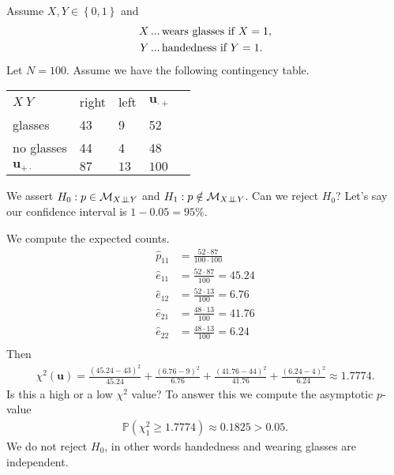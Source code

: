 \begin{eg}
  Assume \( X,Y \in \left\{ 0,1 \right\} \) and
  \begin{align*}
    X \,&...\, \text{wears glasses if \( X = 1 \)}, \\
    Y \, &...\, \text{handedness if \( Y = 1 \)}.
  \end{align*}
  Let \( N = 100 \). Assume we have the following contingency table.
  \begin{table}[H]
    \centering
    \begin{tabular}{l|ll|ll}
    $X \ Y$ & right & left & $\mathbf u_{\cdot +}$  \\ \cline{1-4}
       glasses     & 43    & 9    & 52             \\
        no glasses    & 44    & 4    & 48             \\ \cline{1-4}
       \( \mathbf u_{+ \cdot} \)     & \( 87 \)    & \( 13 \)   &       \( 100 \)        
    \end{tabular}
  \end{table}
  We assert \( H_0: p \in \mathcal{M}_{X \perp \!\!\! \perp Y} \) and \( H_1 : p \notin \mathcal{M}_{X \perp \!\!\! \perp Y} \). Can we reject \( H_0 \)? Let's say our confidence interval is \( 1 - 0.05 = 95\% \).

  We compute the expected counts.
  \begin{align*}
    \hat p_{11} &= \frac{52 \cdot 87}{100 \cdot 100}\\
    \hat e_{11} &= \frac{52 \cdot 87}{100} = 45.24 \\
    \hat e_{12} &= \frac{52 \cdot 13}{100} = 6.76 \\
    \hat e_{21} &= \frac{48 \cdot 13}{100} = 41.76 \\
    \hat e_{22} &= \frac{48 \cdot 13}{100} = 6.24 \\
  \end{align*}
  Then 
  \begin{align*}
    \chi^2(\mathbf u) = \frac{(45.24 - 43)^2}{45.24} + \frac{(6.76 - 9)^2}{6.76} + \frac{(41.76 - 44)^2}{41.76} + \frac{(6.24 - 4)^2}{6.24} \approx 1.7774.
  \end{align*}
  Is this a high or a low \( \chi^2 \) value? To answer this we compute the asymptotic \( p \)-value
  \begin{align*}
    \mathbb{P}(\chi_{1}^2 \geq 1.7774) \approx 0.1825 > 0.05.
  \end{align*}
  We do not reject \( H_0 \), in other words handedness and wearing glasses are independent.
\end{eg}

